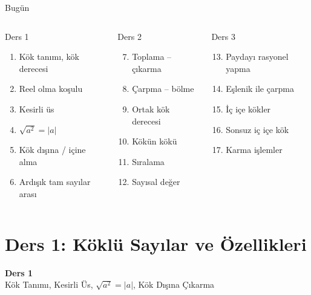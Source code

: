 \documentclass[aspectratio=169,11pt,handout]{beamer}
\begin{document}
\begin{frame}{Bugün}
\begin{columns}[t]
\begin{block}{Ders 1}
\begin{enumerate}
\item Kök tanımı, kök derecesi
\item Reel olma koşulu
\item Kesirli üs
\item \(\sqrt{a^2}=|a|\)
\item Kök dışına / içine alma
\item Ardışık tam sayılar arası
\end{enumerate}
\end{block}
\begin{block}{Ders 2}
\begin{enumerate}\setcounter{enumi}{6}
\item Toplama -- çıkarma
\item Çarpma -- bölme
\item Ortak kök derecesi
\item Kökün kökü
\item Sıralama
\item Sayısal değer
\end{enumerate}
\end{block}
\begin{block}{Ders 3}
\begin{enumerate}\setcounter{enumi}{12}
\item Paydayı rasyonel yapma
\item Eşlenik ile çarpma
\item İç içe kökler
\item Sonsuz iç içe kök
\item Karma işlemler
\end{enumerate}
\end{block}
\end{columns}
\end{frame}

\section{Ders 1: Köklü Sayılar ve Özellikleri}
\begin{frame}
\centering\Large\color{anamavi}\textbf{Ders 1}\\[6pt]\normalsize Kök Tanımı, Kesirli Üs, \(\sqrt{a^2}=|a|\), Kök Dışına Çıkarma
\end{frame}
\end{document}
